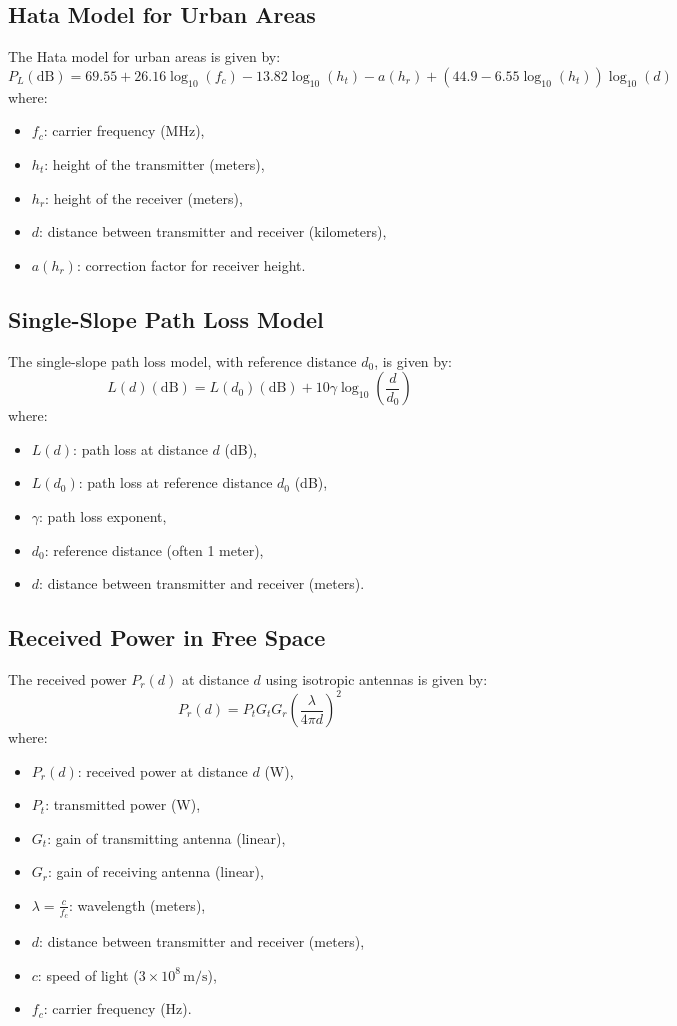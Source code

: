 \documentclass[a4paper,12pt]{book}
\begin{document}
	\subsection{Hata Model for Urban Areas}
	The Hata model for urban areas is given by:
	\[
	P_L(\text{dB}) = 69.55 + 26.16 \log_{10}(f_c) - 13.82 \log_{10}(h_t) - a(h_r) + \left( 44.9 - 6.55 \log_{10}(h_t) \right) \log_{10}(d)
	\]
	where:
	\begin{itemize}
		\item \( f_c \): carrier frequency (MHz),
		\item \( h_t \): height of the transmitter (meters),
		\item \( h_r \): height of the receiver (meters),
		\item \( d \): distance between transmitter and receiver (kilometers),
		\item \( a(h_r) \): correction factor for receiver height.
	\end{itemize}
	
	\subsection{Single-Slope Path Loss Model}
	The single-slope path loss model, with reference distance \(d_0\), is given by:
	\[
	L(d) (\text{dB}) = L(d_0) (\text{dB}) + 10 \gamma \log_{10} \left( \frac{d}{d_0} \right)
	\]
	where:
	\begin{itemize}
		\item \( L(d) \): path loss at distance \( d \) (dB),
		\item \( L(d_0) \): path loss at reference distance \( d_0 \) (dB),
		\item \( \gamma \): path loss exponent,
		\item \( d_0 \): reference distance (often 1 meter),
		\item \( d \): distance between transmitter and receiver (meters).
	\end{itemize}
	
	\subsection{Received Power in Free Space}
	The received power \(P_r(d)\) at distance \(d\) using isotropic antennas is given by:
	\[
	P_r(d) = P_t G_t G_r \left( \frac{\lambda}{4 \pi d} \right)^2
	\]
	where:
	\begin{itemize}
		\item \( P_r(d) \): received power at distance \( d \) (W),
		\item \( P_t \): transmitted power (W),
		\item \( G_t \): gain of transmitting antenna (linear),
		\item \( G_r \): gain of receiving antenna (linear),
		\item \( \lambda = \frac{c}{f_c} \): wavelength (meters),
		\item \( d \): distance between transmitter and receiver (meters),
		\item \( c \): speed of light (\( 3 \times 10^8 \, \text{m/s} \)),
		\item \( f_c \): carrier frequency (Hz).
	\end{itemize}
	
\end{document}

